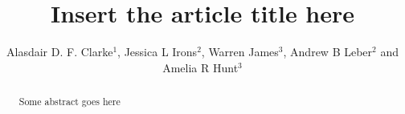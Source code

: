 \documentclass[]{rsos}%
\begin{document}
\linenumbers
\title{Insert the article title here}

\author{%
Alasdair D. F. Clarke$^1$, Jessica L Irons$^2$, Warren James$^3$, Andrew B Leber$^2$ and Amelia R Hunt$^3$}

\address{$^{1}$Department of Psychology, University of Essex, Colchester, UK\\
$^{2}$Department of Psychology, The Ohio State University, Columbus, USA\\
$^{3}$School of Psychology, University of Aberdeen, Aberdeen, UK
}

\subject{Behaviour, evolution}



\begin{abstract}
Some abstract goes here
\end{abstract}

\end{document}
